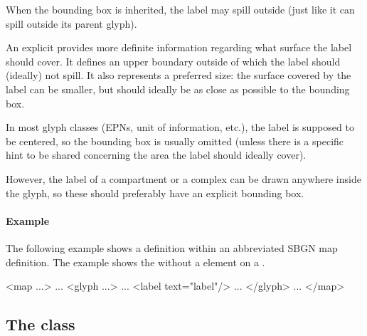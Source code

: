 When the bounding box is inherited, the label may spill outside (just like it can spill outside its parent glyph).

An explicit  provides more definite information regarding what surface the label should cover. It defines an upper boundary outside of which the label should (ideally) not spill. It also represents a preferred size: the surface covered by the label can be smaller, but should ideally be as close as possible to the bounding box.

In most glyph classes (EPNs, unit of information, etc.), the label is supposed to be centered, so the bounding box is usually omitted (unless there is a specific hint to be shared concerning the area the label should ideally cover).

However, the label of a compartment or a complex can be drawn anywhere inside the glyph, so these should preferably have an explicit bounding box.

\paragraph{Example}

The following example shows a \Label definition within an abbreviated SBGN map definition. The example shows the \Label without a  element on a \Glyph.

\begin{example}
<map ...>
    ...
    <glyph ...>
        ...
        <label text="label"/>
        ...
    </glyph>
    ...
</map>
\end{example}


\subsection{The  class}
\label{glyph-class}

